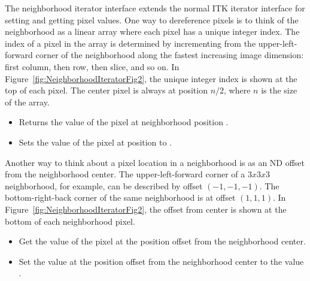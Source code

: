 {The neighborhood iterator interface extends the normal ITK iterator interface
for setting and getting pixel values.  One way to dereference pixels is to
think of the neighborhood as a linear array where each pixel has a unique
integer index. The index of a pixel in the array is determined by incrementing
from the upper-left-forward corner of the neighborhood along the fastest
increasing image dimension: first column, then row, then slice, and so on.  In
Figure~\ref{fig:NeighborhoodIteratorFig2}, the unique integer index is shown
at the top of each pixel.  The center pixel is always at position $n/2$, where
$n$ is the size of the array.

\begin{itemize}

\item \textbf{} Returns the 
value of the pixel at neighborhood position .

\item \textbf{} 
Sets the value of the pixel at position  to .

\end{itemize}

Another way to think about a pixel location in a neighborhood is as an
ND offset from the neighborhood center.  The upper-left-forward corner
of a $3x3x3$ neighborhood, for example, can be described by offset
$(-1, -1, -1)$.  The bottom-right-back corner of the same neighborhood
is at offset $(1, 1, 1)$.  In
Figure~\ref{fig:NeighborhoodIteratorFig2}, the offset from center is
shown at the bottom of each neighborhood pixel.

\begin{itemize}

\item \textbf{} Get the value of
the pixel at the position offset  from the neighborhood center.

\item \textbf{} Set
the value at the position offset  from the neighborhood center to
the value .

\end{itemize}

}
